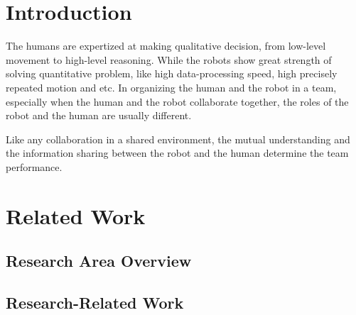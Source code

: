 \documentclass[phd]{byuprop}
\title{\Title}
\author{\Author}
\begin{document}
\maketitle

\section{Introduction}

The humans are expertized at making qualitative decision, from low-level movement to high-level reasoning.
While the robots show great strength of solving quantitative problem, like high data-processing speed, high precisely repeated motion and etc. 
In organizing the human and the robot in a team, especially when the human and the robot collaborate together, the roles of the robot and the human are usually different.

Like any collaboration in a shared environment, the mutual understanding and the information sharing between the robot and the human determine the team performance.




\section{Related Work}

\subsection{Research Area Overview}


\subsection{Research-Related Work}
\end{document}
